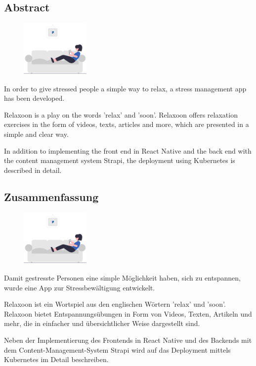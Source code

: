 \begin{spacing}{1}
    \chapter*{Abstract}
\end{spacing}
\begin{figure}
    \begin{center}
      \includegraphics[width=0.3\textwidth]{pics/undraw_Relaxing_at_home_re_mror.png}
    \end{center}
\end{figure}
In order to give stressed people a simple way to relax, a stress management app has been developed.

Relaxoon is a play on the words 'relax' and 'soon'. Relaxoon offers relaxation exercises in the form of videos, 
texts, articles and more, which are presented in a simple and clear way.

In addition to implementing the front end in React Native and the back end with the content management system
Strapi, the deployment using Kubernetes is described in detail.
\newpage
\begin{spacing}{1}
    \chapter*{Zusammenfassung}
\end{spacing}
\begin{figure}
    \begin{center}
      \includegraphics[width=0.3\textwidth]{pics/undraw_Relaxing_at_home_re_mror.png}
    \end{center}
\end{figure}
Damit gestresste Personen eine simple Möglichkeit haben, sich zu entspannen, wurde eine App zur Stressbewältigung
entwickelt. 

Relaxoon ist ein Wortspiel aus den englischen Wörtern 'relax' und 'soon'. Relaxoon bietet Entspannungsübungen 
in Form von Videos, Texten, Artikeln und mehr, die in einfacher und übersichtlicher Weise dargestellt sind.

Neben der Implementierung des Frontends in React Native und des Backends mit dem Content-Management-System
Strapi wird auf das Deployment mittels Kubernetes im Detail beschreiben.

